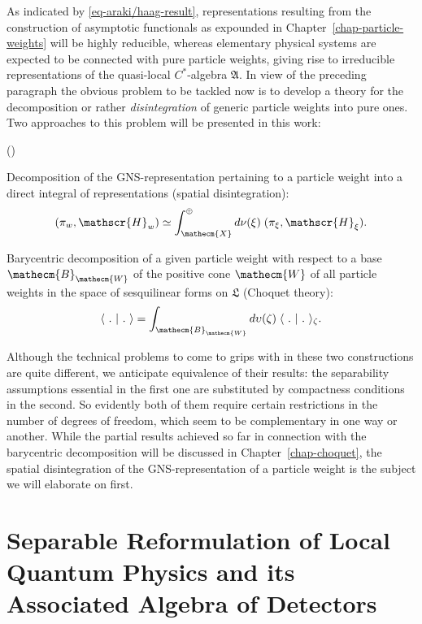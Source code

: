 \documentclass[11pt,twoside,openright]{report}
\theoremstyle{definition}
\theoremstyle{plain}
\theoremstyle{remark}
\theoremstyle{assumption}
\newcommand{\scp}[2]{\langle #1 \vert #2 \rangle}
\newcommand{\Becm}{\mathecm{B}}
\newcommand{\Wecm}{\mathecm{W}}
\newcommand{\Xecm}{\mathecm{X}}
\newcommand{\Afrak}{\mathfrak{A}}
\newcommand{\Lfrak}{\mathfrak{L}}
\newcommand{\Hscr}{\mathscr{H}}
\newcounter{abcitem}
\newenvironment{abclist}{\begin{list}{(\Alph{abcitem})}%
  {\usecounter{abcitem} \setlength{\topsep}{0ex}%
   \setlength{\parsep}{0.2ex} \setlength{\itemsep}{0.4ex}%
   \setlength{\leftmargin}{2em}}}{\end{list}}
\begin{document}
As indicated by \eqref{eq-araki/haag-result}, representations
resulting from the construction of asymptotic functionals as expounded
in Chapter~\ref{chap-particle-weights} will be highly reducible,
whereas elementary physical systems are expected to be connected with
pure particle weights, giving rise to irreducible representations of
the quasi-local $C^*$-algebra $\Afrak$. In view of the preceding
paragraph the obvious problem to be tackled now is to develop a theory
for the decomposition or rather \emph{disintegration} of generic
particle weights into pure ones. Two approaches to this problem will
be presented in this work:
\begin{abclist}
\item Decomposition of the GNS-representation pertaining to a particle
  weight into a direct integral of representations (spatial
  disintegration):
  \begin{equation*}
    ( \pi_w , \Hscr_w ) \simeq \int_\Xecm^\oplus d \nu ( \xi ) \; (
    \pi_\xi , \Hscr_\xi ) \text{.}
  \end{equation*}
\item Barycentric decomposition of a given particle weight with
  respect to a base $\Becm_\Wecm$ of the positive cone $\Wecm$ of all
  particle weights in the space of sesquilinear forms on $\Lfrak$
  (Choquet theory):
  \begin{equation*}
    \scp{~.~}{~.~} = \int_{\Becm_\Wecm} d \upsilon ( \zeta ) \;
    \scp{~.~}{~.~}_\zeta \text{.}
  \end{equation*}
\end{abclist}
Although the technical problems to come to grips with in these two
constructions are quite different, we anticipate equivalence of their
results: the separability assumptions essential in the first one are
substituted by compactness conditions in the second. So evidently both
of them require certain restrictions in the number of degrees of
freedom, which seem to be complementary in one way or another. While
the partial results achieved so far in connection with the barycentric
decomposition will be discussed in Chapter~\ref{chap-choquet}, the
spatial disintegration of the GNS-representation of a particle weight
is the subject we will elaborate on first.


\section[Separable Reformulation]{Separable Reformulation of Local
  Quantum Physics and its Associated Algebra of Detectors} 
  \label{sec-separable-reformulation}
\end{document}
